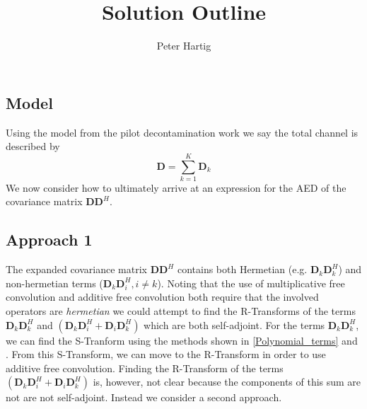 \documentclass[12pt,a4paper]{article}
\title{Solution Outline}
\author{Peter Hartig}
\begin{document}
\maketitle
\subsection{Model} 

Using the model from the pilot decontamination work we say the total channel is described by 
\begin{equation}
\mathbf{D} = \sum_{k=1}^{K}\mathbf{\mathbf{D}}_k 
\end{equation}
We now consider how to ultimately arrive at an expression for the AED of the covariance matrix $\mathbf{D}\mathbf{D}^H$.
\subsection{Approach 1} 
The expanded covariance matrix $\mathbf{D}\mathbf{D}^H$ contains both Hermetian (e.g. $\mathbf{D}_k \mathbf{D}_k ^H$) and non-hermetian terms ($\mathbf{D}_k \mathbf{D}_i^H, i \neq k$). Noting that the use of multiplicative free convolution and additive free convolution both require that the involved operators are \emph{hermetian} we could attempt to find the R-Transforms of the terms $\mathbf{D}_k \mathbf{D}_k ^H$ and $(\mathbf{D}_k \mathbf{D}_i^H+\mathbf{D}_i \mathbf{D}_k^H)$ which are both self-adjoint. 
For the terms $\mathbf{D}_k \mathbf{D}_k ^H$, we can find the S-Tranform using the methods shown in \ref{Polynomial_terms} and \cite{muller2002asymptotic}. From this S-Transform, we can move to the R-Transform in order to use additive free convolution. Finding the R-Transform of the terms $(\mathbf{D}_k \mathbf{D}_i^H+\mathbf{D}_i \mathbf{D}_k^H)$ is, however, not clear because the components of this sum are not are not self-adjoint.
Instead we consider a second approach. 
\end{document}

